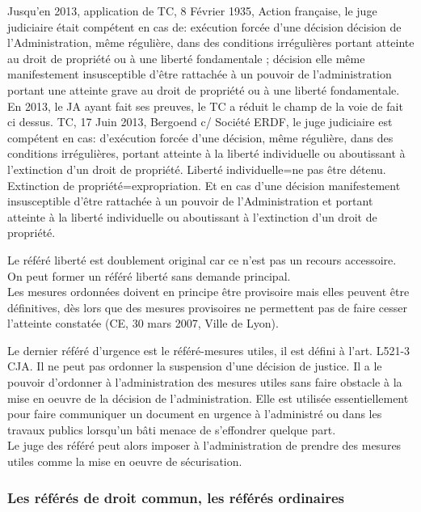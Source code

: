 \documentclass[10pt, a4paper, openany]{book}
\begin{document}
Jusqu'en 2013, application de TC, 8 Février 1935, Action française, le juge judiciaire était compétent en cas de: exécution forcée d'une décision décision de l'Administration, même régulière, dans des conditions irrégulières portant atteinte au droit de propriété ou à une liberté fondamentale ; décision elle même manifestement insusceptible d'être rattachée à un pouvoir de l'administration portant une atteinte grave au droit de propriété ou à une liberté fondamentale. \\
En 2013, le JA ayant fait ses preuves, le TC a réduit le champ de la voie de fait ci dessus. TC, 17 Juin 2013, Bergoend c/ Société ERDF, le juge judiciaire est compétent en cas: d'exécution forcée d'une décision, même régulière, dans des conditions irrégulières, portant atteinte à la liberté individuelle ou aboutissant à l'extinction d'un droit de propriété. Liberté individuelle=ne pas être détenu. Extinction de propriété=expropriation. Et en cas d'une décision manifestement insusceptible d'être rattachée à un pouvoir de l'Administration et portant atteinte à la liberté individuelle ou aboutissant à l'extinction d'un droit de propriété. 


Le référé liberté est doublement original car ce n'est pas un recours accessoire. On peut former un référé liberté sans demande principal. \\
Les mesures ordonnées doivent en principe être provisoire mais elles peuvent être définitives, dès lors que des mesures provisoires ne permettent pas de faire cesser l'atteinte constatée (CE, 30 mars 2007, Ville de Lyon). 


Le dernier référé d'urgence est le référé-mesures utiles, il est défini à l'art. L521-3 CJA. Il ne peut pas ordonner la suspension d'une décision de justice. Il a le pouvoir d'ordonner à l'administration des mesures utiles sans faire obstacle à la mise en oeuvre de la décision de l'administration. Elle est utilisée essentiellement pour faire communiquer un document en urgence à l'administré ou dans les travaux publics lorsqu'un bâti menace de s'effondrer quelque part. \\
Le juge des référé peut alors imposer à l'administration de prendre des mesures utiles comme la mise en oeuvre de sécurisation. 

\subsubsection{Les référés de droit commun, les référés ordinaires}
\end{document}
